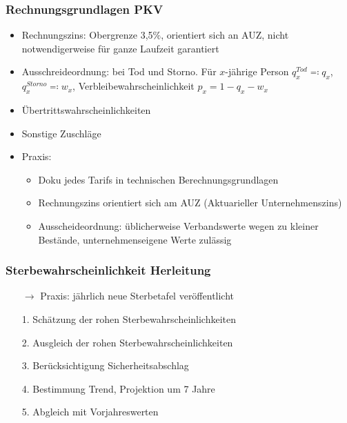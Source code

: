 \documentclass[12pt]{report}
\theoremstyle{dotless}
\theoremstyle{definition}
\begin{document}
\subsubsection{Rechnungsgrundlagen PKV}
\begin{itemize}
	\item Rechnungszins: Obergrenze 3,5$\%$, orientiert sich an AUZ, nicht notwendigerweise für ganze Laufzeit garantiert
	\item Ausschreideordnung: bei Tod und Storno. Für $x$-jährige Person $q^{Tod}_x \eqqcolon q_x$, $q_x^{Storno} \eqqcolon w_x$, Verbleibewahrscheinlichkeit $p_x=1-q_x-w_x$
	\item Übertrittswahrscheinlichkeiten
	\item Sonstige Zuschläge
	\item Praxis: 
		\begin{itemize}
			\item Doku jedes Tarifs in technischen Berechnungsgrundlagen
			\item Rechnungszins orientiert sich am AUZ (Aktuarieller Unternehmenszins)
			\item Ausscheideordnung: üblicherweise Verbandswerte wegen zu kleiner Bestände, unternehmenseigene Werte zulässig
		\end{itemize}
\end{itemize}

\subsubsection{Sterbewahrscheinlichkeit Herleitung}
\begin{itemize}
	\item[$\rightarrow$] Praxis: jährlich neue Sterbetafel veröffentlicht
	\item[1.] Schätzung der rohen Sterbewahrscheinlichkeiten
	\item[2.] Ausgleich der rohen Sterbewahrscheinlichkeiten
	\item[3.] Berücksichtigung Sicherheitsabschlag
	\item[4.] Bestimmung Trend, Projektion um 7 Jahre
	\item[5.] Abgleich mit Vorjahreswerten 
\end{itemize}
\end{document}
